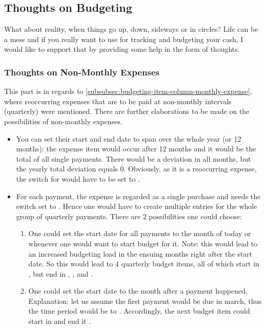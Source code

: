 \subsection{Thoughts on Budgeting}
\label{subsec:thoughts-on-budgeting}

What about reality, when things go up, down, sideways or in circles?
Life can be a mess and if you really want to use \tfn for tracking and budgeting your cash, I would like to support that by providing some help in the form of thoughts.

\subsubsection{Thoughts on Non-Monthly Expenses}
\label{subsubsec:thoughts-non-monthly-expenses}

This part is in regards to \autoref{subsubsec:budgeting-item-column-monthly-expense}, where reoccurring expenses that are to be paid at non-monthly intervals (\eg quarterly) were mentioned.
There are further elaborations to be made on the possibilities of non-monthly expenses.
\begin{itemize}
	\item You can set their start and end date to span over the whole year (or 12 months): the expense item would occur after 12 months and it would be the total of all single payments.
	There would be a deviation in all months, but the yearly total deviation equals 0.
	Obviously, as it is a reoccurring expense, the switch for  would have to be set to .
	\item For each payment, \ie the expense is regarded as a single purchase and needs the  switch set to .
	Hence one would have to create multiple entries for the whole group of quarterly payments.
	There are 2 possibilities one could choose:
	\begin{enumerate}
		\item One could set the start date for all payments to the month of today or whenever one would want to start budget for it.
		Note: this would lead to an increased budgeting load in the ensuing months right after the start date.
		So this would lead to 4 quarterly budget items, all of which start in , but end in , ,  and .
		\item One could set the start date to the month after a payment happened.
		Explanation: let us assume the first payment would be due in march, thus the time period would be  to .
		Accordingly, the next budget item could start in  and end it .
	\end{enumerate}
\end{itemize}

